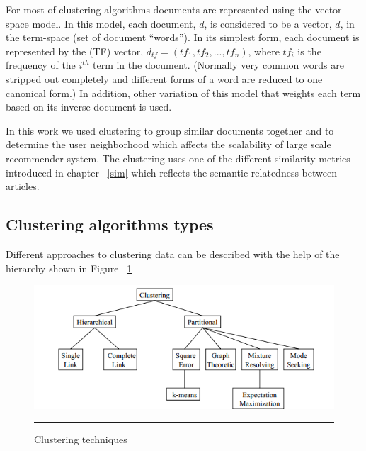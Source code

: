\citep{clustering_15} For most of clustering algorithms documents are represented using the vector-space model. In
this model, each document, $d$, is considered to be a vector, $d$, in the term-space (set of document
“words”). In its simplest form, each document is represented by the (TF) vector,
$d_{tf} = (tf_1, tf_2,..., tf_n)$, where $tf_i$ is the frequency of the $i^{th}$ term in the document. (Normally very common words are
stripped out completely and different forms of a word are reduced to one canonical form.) In
addition, other variation of this model that weights each term based on its inverse document is used.

In this work we used clustering to group similar documents together and to determine the user neighborhood which affects the scalability of large scale recommender system. The clustering uses one of the different similarity metrics introduced in chapter ~\ref{sim} which reflects the semantic relatedness between articles.
\subsection{Clustering algorithms types}
Different approaches to clustering data can be described with the help of the hierarchy shown in Figure ~\ref{fig:clustering_approaches}

\begin{figure}[htbp]
	\centering
		\includegraphics{./Figures/clustering.png}
		\rule{35em}{0.5pt}
	\caption[Clustering techniques]{Clustering techniques}
	\label{fig:clustering_approaches}
\end{figure}

